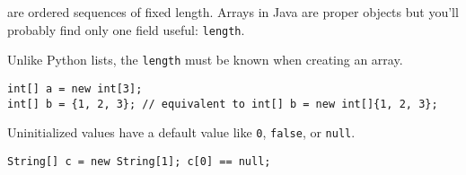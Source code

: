 \begin{blocksection}
 are ordered sequences of fixed length. Arrays in Java are
proper objects but you'll probably find only one field useful:
\lstinline$length$.

Unlike Python lists, the \lstinline$length$ must be known when creating an
array.

\begin{lstlisting}
int[] a = new int[3];
int[] b = {1, 2, 3}; // equivalent to int[] b = new int[]{1, 2, 3};
\end{lstlisting}

Uninitialized values have a default value like \lstinline$0$,
\lstinline$false$, or \lstinline$null$.

\begin{lstlisting}
String[] c = new String[1]; c[0] == null;
\end{lstlisting}
\end{blocksection}
